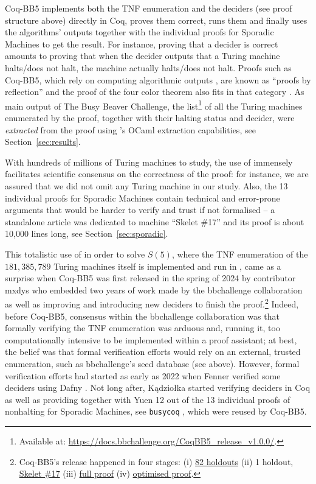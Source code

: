\documentclass[a4paper,british]{article}
\theoremstyle{definition} %
\numberwithin{equation}{section}
\theoremstyle{definition} %
\newcommand{\BBtheFifthTNF}{181{,}385{,}789}
\newcommand{\CoqBB}{Coq-BB5\xspace}
\begin{document}
\CoqBB implements both the TNF enumeration and the deciders (see proof structure above) directly in Coq, proves them correct, runs them and finally uses the algorithms' outputs together with the individual proofs for Sporadic Machines to get the result. For instance, proving that a decider is correct amounts to proving that when the decider outputs that a Turing machine halts/does not halt, the machine actually halts/does not halt. Proofs such as \CoqBB, which rely on computing algorithmic outputs \cite{vmcompute,nativecompute}, are known as ``proofs by reflection'' \cite{boutin1997using} and the \Coq proof of the four color theorem also fits in that category \cite{gonthier2010introduction}. As main output of The Busy Beaver Challenge, the list\footnote{Available at: \url{https://docs.bbchallenge.org/CoqBB5_release_v1.0.0/}.} of all the Turing machines enumerated by the \Coq proof, together with their halting status and decider, were \textit{extracted} from the proof using \Coq's OCaml extraction capabilities, see Section~\ref{sec:results}.

With hundreds of millions of Turing machines to study, the use of \Coq immensely facilitates scientific consensus on the correctness of the proof: for instance, we are assured that we did not omit any Turing machine in our study. Also, the 13 individual proofs for Sporadic Machines contain technical and error-prone arguments that would be harder to verify and trust if not formalised -- \eg a standalone article was dedicated to machine ``Skelet \#17'' \cite{xu2024skelet17fifthbusy} and its \Coq proof is about 10,000 lines long, see Section~\ref{sec:sporadic}.



This totalistic use of \Coq in order to solve $S(5)$, where the TNF enumeration of the $\BBtheFifthTNF$ Turing machines itself is implemented and run in \Coq, came as a surprise when \CoqBB was first released in the spring of 2024 by contributor mxdys who embedded two years of work made by the bbchallenge collaboration as well as improving and introducing new deciders to finish the proof.\footnote{\CoqBB's release happened in four stages: (i) \href{https://discuss.bbchallenge.org/t/proving-bb-5-in-coq/225}{82 holdouts} (ii) 1 holdout, \href{https://bbchallenge.org/1RB---_0LC1RE_0LD1LC_1RA1LB_0RB0RA}{Skelet \#17} (iii) \href{https://discuss.bbchallenge.org/t/july-2nd-2024-we-have-proved-bb-5-47-176-870/237}{full proof} (iv) \href{https://github.com/ccz181078/Coq-BB5}{optimised proof}.} Indeed, before \CoqBB, consensus within the bbchallenge collaboration  was that formally verifying the TNF enumeration was arduous and, running it, too computationally intensive to be implemented within a proof assistant; at best, the belief was that formal verification efforts would rely on an external, trusted enumeration, such as bbchallenge's seed database (see above). However, formal verification efforts had started as early as 2022 when Fenner verified some deciders using Dafny \cite{dafny_fenner, Dafny}. Not long after, Kądziołka started verifying deciders in Coq as well as providing together with Yuen 12 out of the 13 individual proofs of nonhalting for Sporadic Machines, see  \texttt{busycoq} \cite{busycoq}, which were reused by \CoqBB.
\end{document}
